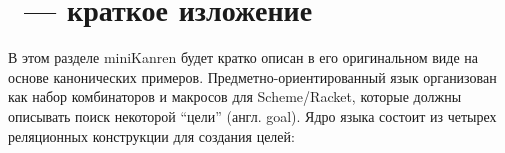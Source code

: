 
\section{\miniKanren~--- краткое изложение}
\label{sec:demo}

В этом разделе miniKanren будет кратко описан в его оригинальном виде на основе канонических примеров.
Предметно-ориентированный язык организован как набор комбинаторов и макросов для Scheme/Racket, которые должны описывать поиск некоторой \enquote{цели} (англ. goal).
Ядро языка состоит из четырех реляционных конструкции для создания целей:

